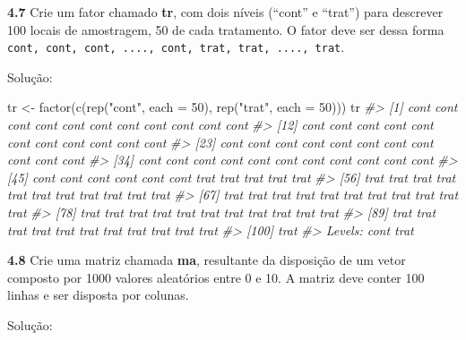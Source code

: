 \documentclass[
]{book}
\newenvironment{Shaded}{\begin{snugshade}}{\end{snugshade}}
\newcommand{\AttributeTok}[1]{\textcolor[rgb]{0.77,0.63,0.00}{#1}}
\newcommand{\CommentTok}[1]{\textcolor[rgb]{0.56,0.35,0.01}{\textit{#1}}}
\newcommand{\DecValTok}[1]{\textcolor[rgb]{0.00,0.00,0.81}{#1}}
\newcommand{\FunctionTok}[1]{\textcolor[rgb]{0.00,0.00,0.00}{#1}}
\newcommand{\NormalTok}[1]{#1}
\newcommand{\OtherTok}[1]{\textcolor[rgb]{0.56,0.35,0.01}{#1}}
\newcommand{\StringTok}[1]{\textcolor[rgb]{0.31,0.60,0.02}{#1}}
\begin{document}
\textbf{4.7} Crie um fator chamado \textbf{tr}, com dois níveis (``cont'' e ``trat'') para descrever 100 locais de amostragem, 50 de cada tratamento. O fator deve ser dessa forma \texttt{cont,\ cont,\ cont,\ ....,\ cont,\ trat,\ trat,\ ....,\ trat}.

Solução:

\begin{Shaded}
\begin{Highlighting}[]
\NormalTok{tr }\OtherTok{\textless{}{-}} \FunctionTok{factor}\NormalTok{(}\FunctionTok{c}\NormalTok{(}\FunctionTok{rep}\NormalTok{(}\StringTok{"cont"}\NormalTok{, }\AttributeTok{each =} \DecValTok{50}\NormalTok{), }\FunctionTok{rep}\NormalTok{(}\StringTok{"trat"}\NormalTok{, }\AttributeTok{each =} \DecValTok{50}\NormalTok{)))}
\NormalTok{tr}
\CommentTok{\#\textgreater{}   [1] cont cont cont cont cont cont cont cont cont cont cont}
\CommentTok{\#\textgreater{}  [12] cont cont cont cont cont cont cont cont cont cont cont}
\CommentTok{\#\textgreater{}  [23] cont cont cont cont cont cont cont cont cont cont cont}
\CommentTok{\#\textgreater{}  [34] cont cont cont cont cont cont cont cont cont cont cont}
\CommentTok{\#\textgreater{}  [45] cont cont cont cont cont cont trat trat trat trat trat}
\CommentTok{\#\textgreater{}  [56] trat trat trat trat trat trat trat trat trat trat trat}
\CommentTok{\#\textgreater{}  [67] trat trat trat trat trat trat trat trat trat trat trat}
\CommentTok{\#\textgreater{}  [78] trat trat trat trat trat trat trat trat trat trat trat}
\CommentTok{\#\textgreater{}  [89] trat trat trat trat trat trat trat trat trat trat trat}
\CommentTok{\#\textgreater{} [100] trat}
\CommentTok{\#\textgreater{} Levels: cont trat}
\end{Highlighting}
\end{Shaded}

\textbf{4.8}
Crie uma matriz chamada \textbf{ma}, resultante da disposição de um vetor composto por 1000 valores aleatórios entre 0 e 10. A matriz deve conter 100 linhas e ser disposta por colunas.

Solução:
\end{document}
